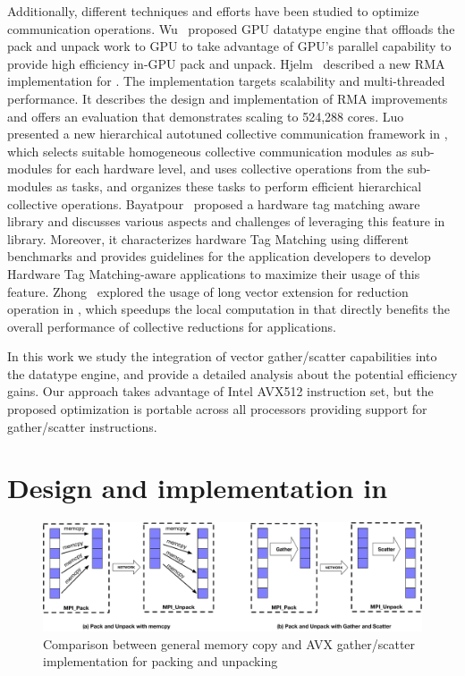 \documentclass[conference]{IEEEtran}
\begin{document}
Additionally, different techniques and
efforts have been studied to optimize \mpi communication operations.
Wu~\cite{wu2016} proposed GPU datatype engine that offloads the pack and unpack
work to GPU to take advantage of GPU's parallel capability to provide
high efficiency in-GPU pack and unpack.
%
Hjelm~\cite{Hjelm} described a new RMA implementation for \ompi. The implementation targets scalability
and multi-threaded performance. It describes the design and implementation of RMA improvements
and offers an evaluation that demonstrates scaling to 524,288 cores.
%
Luo~\cite{luo-han} presented a new hierarchical autotuned collective communication
framework in \ompi, which selects suitable homogeneous collective communication
modules as sub-modules for each hardware level, and uses collective operations from
the sub-modules as tasks, and organizes these tasks to perform efficient hierarchical collective operations.
Bayatpour~\cite{Bayatpour} proposed a hardware tag matching aware \mpi library and discusses
various aspects and challenges of leveraging this feature in \mpi library. Moreover, it characterizes
hardware Tag Matching using different benchmarks and provides guidelines for the
application developers to develop Hardware Tag Matching-aware applications to maximize their usage of this feature.
%
Zhong~\cite{avxop} explored the usage of long vector extension for reduction operation in \mpi, which
speedups the local computation in \mpi that directly benefits the overall performance of
collective reductions for applications.

In this work we study the integration of vector gather/scatter capabilities
into the \mpi datatype engine, and provide a detailed analysis about the
potential efficiency gains.
%
Our approach takes advantage of Intel AVX512 instruction set, but the proposed
optimization is portable across all processors providing support for
gather/scatter instructions.


\section{Design and implementation in \ompi}\label{sec:design}

\begin{figure}[ht]
  \centering
  \includegraphics[width=0.9\linewidth]{send_recv_gs1.pdf}
  \caption{Comparison between general memory copy and AVX gather/scatter implementation for packing and unpacking}
  \label{fig:send_recv_gs1}
\end{figure}
\end{document}
